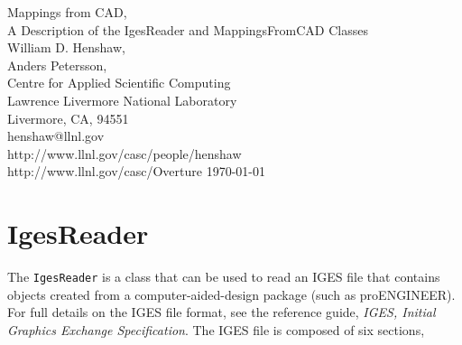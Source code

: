 \documentclass{article}
\begin{document}


\def\uvd    {{\bf U}}
\def\ud     {{    U}}
\def\pd     {{    P}}
\def\id     {i}
\def\jd     {j}
\def\kap {\sqrt{s+\omega^2}}

\newcommand{\mapping}{/home/henshaw/Overture/mapping}
\newcommand{\figures}{../docFigures}

\vspace{3\baselineskip}
\begin{flushleft}
  {\Large 
   Mappings from CAD, \\
   A Description of the IgesReader and MappingsFromCAD Classes\\
  }
\vspace{2\baselineskip}
William D. Henshaw, \\
Anders Petersson, \\             
Centre for Applied Scientific Computing \\
Lawrence Livermore National Laboratory    \\
Livermore, CA, 94551   \\
henshaw@llnl.gov \\
http://www.llnl.gov/casc/people/henshaw \\
http://www.llnl.gov/casc/Overture
\vspace{1\baselineskip}
\today
\vspace{\baselineskip}

\end{flushleft}

\vspace{1\baselineskip}

\begin{abstract}
\end{abstract}




\section{IgesReader}

The {\tt IgesReader} is a class that can be used to read an IGES file that contains
objects created from a computer-aided-design package (such as proENGINEER).
For full details on the IGES file format,
see the reference guide, {\sl IGES, Initial Graphics Exchange Specification}\cite{iges}.
The IGES file is composed of six sections,
\end{document}
